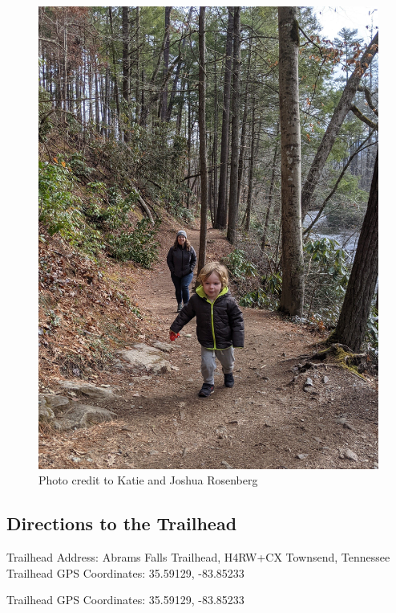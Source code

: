 \documentclass[
  letterpaper,
  DIV=11,
  numbers=noendperiod]{scrreprt}
\begin{document}
\begin{figure}[H]

{\centering \includegraphics[width=6.25in,height=\textheight,keepaspectratio]{img/trail-28-figure-01.jpg}

}

\caption{Photo credit to Katie and Joshua Rosenberg}

\end{figure}%

\subsection{Directions to the
Trailhead}\label{directions-to-the-trailhead-26}

Trailhead Address: Abrams Falls Trailhead, H4RW+CX Townsend, Tennessee
Trailhead GPS Coordinates: 35.59129, -83.85233

Trailhead GPS Coordinates: 35.59129, -83.85233
\end{document}
